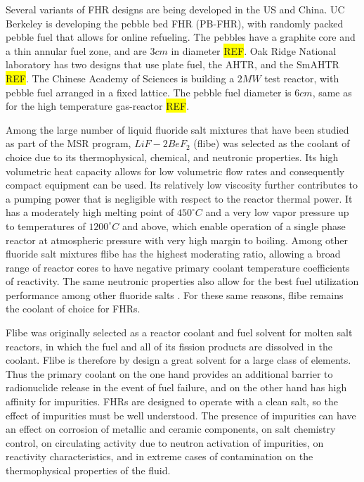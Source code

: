 \documentclass[11pt]{article}
\newcommand{\REF}[0]{\colorbox{yellow}{REF}}
\begin{document}
Several variants of FHR designs are being developed in the US and China.
UC Berkeley is developing the pebble bed FHR (PB-FHR), with randomly packed pebble fuel that allows for online refueling.
The pebbles have a graphite core and a thin annular fuel zone, and are $3cm$ in diameter  \REF.
Oak Ridge National laboratory has two designs that use plate fuel, the AHTR, and the SmAHTR  \REF.
The Chinese Academy of Sciences is building a $2MW$ test reactor, with pebble fuel arranged in a fixed lattice.
The pebble fuel diameter is $6cm$, same as for the high temperature gas-reactor \REF.

Among the large number of liquid fluoride salt mixtures that have been studied as part of the MSR program, $LiF-2 BeF_2$ (flibe) was selected as the coolant of choice due to its thermophysical, chemical, and neutronic properties.
Its high volumetric heat capacity allows for low volumetric flow rates and consequently compact equipment can be used.
Its relatively low viscosity further contributes to a pumping power that is negligible with respect to the reactor thermal power.
It has a moderately high melting point of $450^\circ C$ and a very low vapor pressure up to temperatures of $1200^\circ C$ and above, which enable operation of a single phase reactor at atmospheric pressure with very high margin to boiling.
Among other fluoride salt mixtures flibe has the highest moderating ratio, allowing a broad range of reactor cores to have negative primary coolant temperature coefficients of reactivity.
The same neutronic properties also allow for the best fuel utilization performance among other fluoride salts \cite{williams2006acm}.
For these same reasons, flibe remains the coolant of choice for FHRs.

Flibe was originally selected as a reactor coolant and fuel solvent for molten salt reactors, in which the fuel and all of its fission products are dissolved in the coolant.
Flibe is therefore by design a great solvent for a large class of elements.
Thus the primary coolant on the one hand provides an additional barrier to radionuclide release in the event of fuel failure, and on the other hand has high affinity for impurities.
FHRs are designed to operate with a clean salt, so the effect of impurities must be well understood.
The presence of impurities can have an effect on corrosion of metallic and ceramic components, on salt chemistry control, on circulating activity due to neutron activation of impurities, on reactivity characteristics, and in extreme cases of contamination on the thermophysical properties of the fluid.
\end{document}
